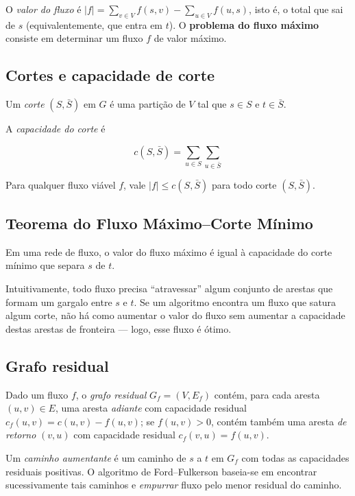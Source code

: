 \documentclass[12pt]{article}
\begin{document}
O \emph{valor do fluxo} é $|f| = \sum\limits_{v\in V} f(s,v) - \sum\limits_{u\in V} f(u,s)$, isto é, o total que sai de $s$ (equivalentemente, que entra em $t$). O \textbf{problema do fluxo máximo} consiste em determinar um fluxo $f$ de valor máximo.

\subsection{Cortes e capacidade de corte} 

Um \emph{corte} $(S,\bar S)$ em $G$ é uma partição de $V$ tal que $s\in S$ e $t\in \bar S$. 

A \emph{capacidade do corte} é

$$ c(S,\bar{S}) = \sum_{u \in S} \sum_{u \in \bar{S}}$$


Para qualquer fluxo viável $f$, vale $|f| \le c(S,\bar S)$ para todo corte $(S,\bar S)$.

\subsection{Teorema do Fluxo Máximo–Corte Mínimo} 

\begin{theorem}
 Em uma rede de fluxo, o valor do fluxo máximo é igual à capacidade do corte mínimo que separa $s$ de $t$. 
\end{theorem} 

Intuitivamente, todo fluxo precisa ``atravessar'' algum conjunto de arestas que formam um gargalo entre $s$ e $t$. Se um algoritmo encontra um fluxo que satura algum corte, não há como aumentar o valor do fluxo sem aumentar a capacidade destas arestas de fronteira — logo, esse fluxo é ótimo.


\subsection{Grafo residual} 

Dado um fluxo $f$, o \emph{grafo residual} $G_f=(V,E_f)$ contém, para cada aresta $(u,v)\in E$, uma aresta \emph{adiante} com capacidade residual $c_f(u,v)=c(u,v)-f(u,v)$; se $f(u,v)>0$, contém também uma aresta \emph{de retorno} $(v,u)$ com capacidade residual $c_f(v,u)=f(u,v)$.

Um \emph{caminho aumentante} é um caminho de $s$ a $t$ em $G_f$ com todas as capacidades residuais positivas. O algoritmo de Ford–Fulkerson baseia-se em encontrar sucessivamente tais caminhos e \emph{empurrar} fluxo pelo menor residual do caminho.
\end{document}
